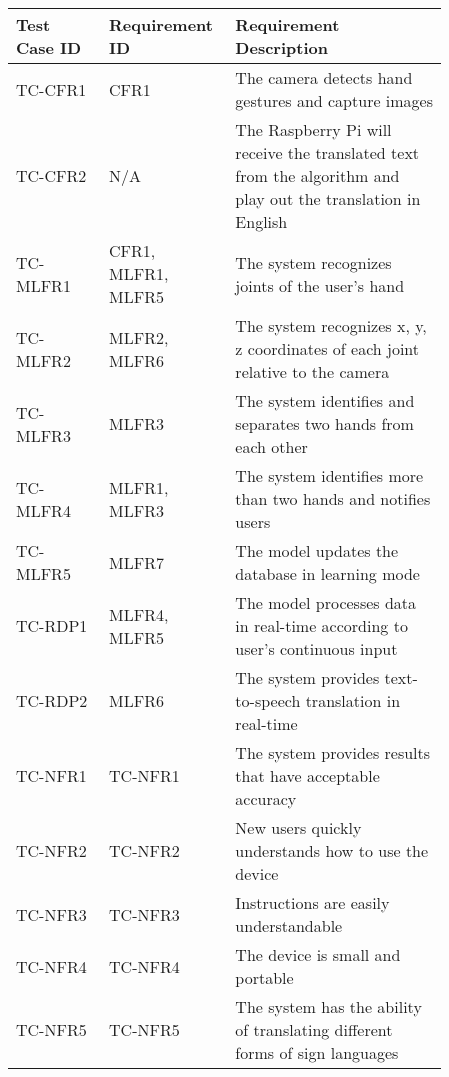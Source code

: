 \documentclass[12pt]{article}
\begin{document}
\renewcommand{\arraystretch}{1.2}
\noindent \begin{tabularx}{\textwidth}{p{0.2\linewidth}|p{0.2\linewidth}|p{0.46\linewidth}}
\toprule
\textbf{Test Case ID} & \textbf{Requirement ID} & \textbf{Requirement Description}\\
\midrule
TC-CFR1 & CFR1 & The camera detects hand gestures and capture images\\ \hline
TC-CFR2 & N/A & The Raspberry Pi will receive the translated text from the algorithm and play out the translation in English\\ \hline
TC-MLFR1 & CFR1, MLFR1, MLFR5 & The system recognizes joints of the user’s hand\\ \hline
TC-MLFR2 & MLFR2, MLFR6 & The system recognizes x, y, z coordinates of each joint relative to the camera\\ \hline
TC-MLFR3 & MLFR3 & The system identifies and separates two hands from each other\\ \hline
TC-MLFR4 & MLFR1, MLFR3 & The system identifies more than two hands and notifies users\\ \hline
TC-MLFR5 & MLFR7 & The model updates the database in learning mode\\ \hline
TC-RDP1 & MLFR4, MLFR5 & The model processes data in real-time according to user’s continuous input\\ \hline
TC-RDP2 & MLFR6 & The system provides text-to-speech translation in real-time\\ \hline
TC-NFR1 & TC-NFR1 & The system provides results that have acceptable accuracy\\ \hline
TC-NFR2 & TC-NFR2 & New users quickly understands how to use the device\\ \hline
TC-NFR3 & TC-NFR3 & Instructions are easily understandable\\ \hline
TC-NFR4 & TC-NFR4 & The device is small and portable\\ \hline
TC-NFR5 & TC-NFR5 & The system has the ability of translating different forms of sign languages\\
\bottomrule
\end{tabularx}

\newpage


\end{document}
